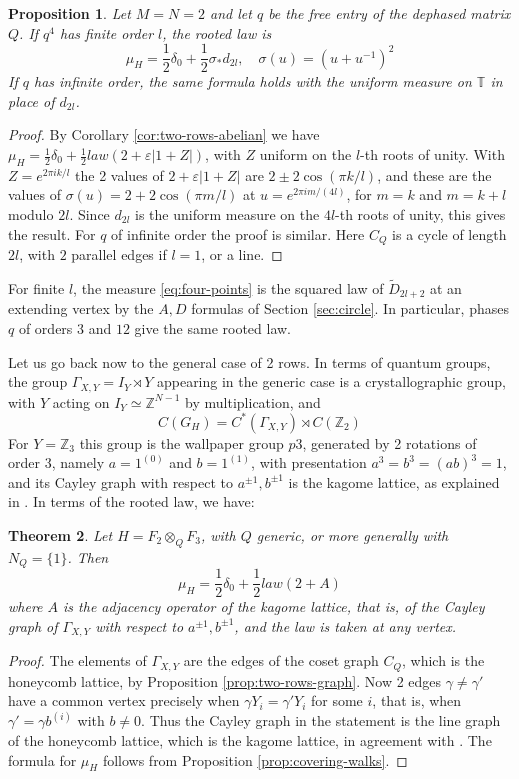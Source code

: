 \documentclass[11pt,reqno]{amsart}
\newtheorem{thm}{Theorem}[section]
\newtheorem{prop}[thm]{Proposition}
\theoremstyle{definition}
\numberwithin{equation}{section}
\begin{document}
\begin{prop}
Let $M=N=2$ and let $q$ be the free entry of the dephased matrix $Q$. If $q^4$ has finite order $l$, the rooted law is
\begin{equation}\label{eq:four-points}
 \mu_H=\frac12\delta_0+\frac12\sigma_*d_{2l},
 \quad \sigma(u)=(u+u^{-1})^2
\end{equation}
If $q$ has infinite order, the same formula holds with the uniform measure on $\mathbb T$ in place of $d_{2l}$.
\end{prop}
\begin{proof}
By Corollary \ref{cor:two-rows-abelian} we have $\mu_H=\frac12\delta_0+\frac12 law(2+\varepsilon|1+Z|)$, with $Z$ uniform on the $l$-th roots of unity. With $Z=e^{2\pi i k/l}$ the 2 values of $2+\varepsilon|1+Z|$ are $2\pm2\cos(\pi k/l)$, and these are the values of $\sigma(u)=2+2\cos(\pi m/l)$ at $u=e^{2\pi i m/(4l)}$, for $m=k$ and $m=k+l$ modulo $2l$. Since $d_{2l}$ is the uniform measure on the $4l$-th roots of unity, this gives the result. For $q$ of infinite order the proof is similar. Here $C_Q$ is a cycle of length $2l$, with $2$ parallel edges if $l=1$, or a line.
\end{proof}

For finite $l$, the measure \eqref{eq:four-points} is the squared law of $\widetilde D_{2l+2}$ at an extending vertex by the $A,D$ formulas of Section \ref{sec:circle}. In particular, phases $q$ of orders $3$ and $12$ give the same rooted law.

Let us go back now to the general case of 2 rows. In terms of quantum groups, the group $\Gamma_{X,Y}=I_Y\rtimes Y$ appearing in the generic case is a crystallographic group, with $Y$ acting on $I_Y\simeq\mathbb Z^{N-1}$ by multiplication, and
$$C(G_H)=C^*(\Gamma_{X,Y})\rtimes C(\mathbb Z_2)$$
For $Y=\mathbb Z_3$ this group is the wallpaper group $p3$, generated by 2 rotations of order 3, namely $a=1^{(0)}$ and $b=1^{(1)}$, with presentation $a^3=b^3=(ab)^3=1$, and its Cayley graph with respect to $a^{\pm1},b^{\pm1}$ is the kagome lattice, as explained in \cite{ABF26}. In terms of the rooted law, we have:

\begin{thm}\label{thm:kagome}
Let $H=F_2\otimes_QF_3$, with $Q$ generic, or more generally with $N_Q=\{1\}$. Then
$$\mu_H=\frac12\delta_0+\frac12 law(2+A)$$
where $A$ is the adjacency operator of the kagome lattice, that is, of the Cayley graph of $\Gamma_{X,Y}$ with respect to $a^{\pm1},b^{\pm1}$, and the law is taken at any vertex.
\end{thm}
\begin{proof}
The elements of $\Gamma_{X,Y}$ are the edges of the coset graph $C_Q$, which is the honeycomb lattice, by Proposition \ref{prop:two-rows-graph}. Now 2 edges $\gamma\neq\gamma'$ have a common vertex precisely when $\gamma Y_i=\gamma'Y_i$ for some $i$, that is, when $\gamma'=\gamma b^{(i)}$ with $b\neq0$. Thus the Cayley graph in the statement is the line graph of the honeycomb lattice, which is the kagome lattice, in agreement with \cite{ABF26}. The formula for $\mu_H$ follows from Proposition \ref{prop:covering-walks}.
\end{proof}
\end{document}

